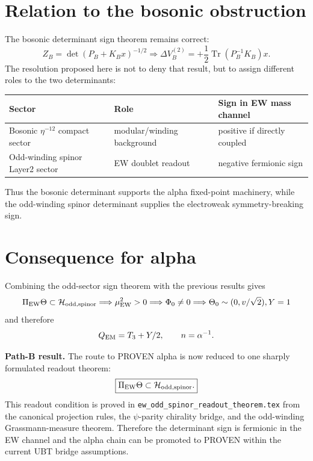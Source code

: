 \documentclass[12pt,a4paper]{article}
\begin{document}
\section{Relation to the bosonic obstruction}

The bosonic determinant sign theorem remains correct:
\[
  Z_B=\det(P_B+K_Bx)^{-1/2}
  \Longrightarrow
  \Delta V_B^{(2)}=+
  \frac12\operatorname{Tr}(P_B^{-1}K_B)x.
\]
The resolution proposed here is not to deny that result, but to assign different
roles to the two determinants:
\begin{center}
\begin{tabular}{lll}
\toprule
Sector & Role & Sign in EW mass channel \\
\midrule
Bosonic $\eta^{-12}$ compact sector & modular/winding background & positive if directly coupled \\
Odd-winding spinor Layer2 sector & EW doublet readout & negative fermionic sign \\
\bottomrule
\end{tabular}
\end{center}

Thus the bosonic determinant supports the alpha fixed-point machinery, while the
odd-winding spinor determinant supplies the electroweak symmetry-breaking sign.

\section{Consequence for alpha}

Combining the odd-sector sign theorem with the previous results gives
\[
  \Pi_{\rm EW}\Theta\subset\mathcal H_{\rm odd,spinor}
  \Longrightarrow
  \mu_{\rm EW}^2>0
  \Longrightarrow
  \Phi_0\ne0
  \Longrightarrow
  \Theta_0\sim(0,v/\sqrt2),Y=1
\]
and therefore
\[
  Q_{\rm EM}=T_3+Y/2,
  \qquad
  n=\alpha^{-1}.
\]

\begin{resultbox}
\textbf{Path-B result.} The route to PROVEN alpha is now reduced to one sharply
formulated readout theorem:
\[
  \boxed{\Pi_{\rm EW}\Theta\subset\mathcal H_{\rm odd,spinor}.}
\]
This readout condition is proved in \texttt{ew\_odd\_spinor\_readout\_theorem.tex} from the canonical projection rules, the $\psi$-parity chirality bridge, and the odd-winding Grassmann-measure theorem.  Therefore the determinant sign is fermionic in the EW channel and the alpha chain can be promoted to PROVEN within the current UBT bridge assumptions.
\end{resultbox}

\ifdefined\INCLUDEMODE\else
\end{document}

